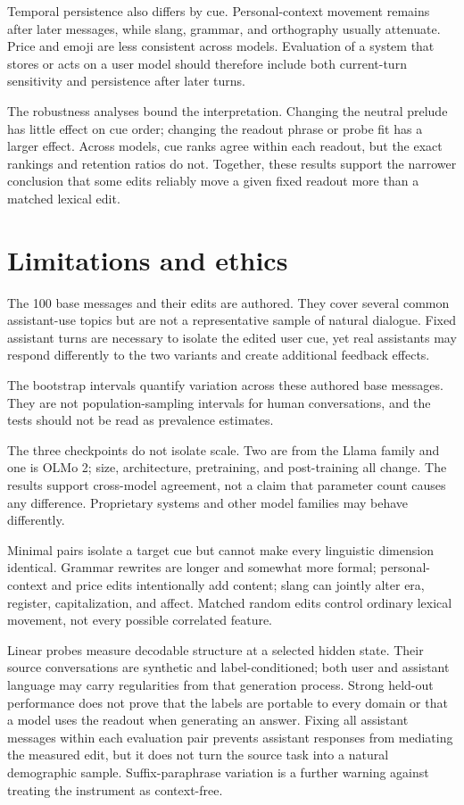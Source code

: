 \documentclass[11pt]{article}
\begin{document}
Temporal persistence also differs by cue. Personal-context movement remains
after later messages, while slang, grammar, and orthography usually attenuate.
Price and emoji are less consistent across models. Evaluation of a system that
stores or acts on a user model should therefore include both current-turn
sensitivity and persistence after later turns.

The robustness analyses bound the interpretation. Changing the neutral prelude
has little effect on cue order; changing the readout phrase or probe fit has a
larger effect. Across models, cue ranks agree within each readout, but the exact
rankings and retention ratios do not. Together, these results support the
narrower conclusion that some edits reliably move a given fixed readout more
than a matched lexical edit.

\section{Limitations and ethics}

The 100 base messages and their edits are authored. They cover several common
assistant-use topics but are not a representative sample of natural dialogue.
Fixed assistant turns are necessary to isolate the edited user cue, yet real
assistants may respond differently to the two variants and create additional
feedback effects.

The bootstrap intervals quantify variation across these authored base
messages. They are not population-sampling intervals for human conversations,
and the tests should not be read as prevalence estimates.

The three checkpoints do not isolate scale. Two are from the Llama family and
one is OLMo 2; size, architecture, pretraining, and post-training all change.
The results support cross-model agreement, not a claim that parameter count
causes any difference. Proprietary systems and other model families may
behave differently.

Minimal pairs isolate a target cue but cannot make every linguistic dimension
identical. Grammar rewrites are longer and somewhat more formal;
personal-context and price edits intentionally add content; slang can jointly alter era,
register, capitalization, and affect. Matched random edits control ordinary
lexical movement, not every possible correlated feature.

Linear probes measure decodable structure at a selected hidden state. Their
source conversations are synthetic and label-conditioned; both user and
assistant language may carry regularities from that generation process. Strong
held-out performance does not prove that the labels are portable to every
domain or that a model uses the readout when generating an answer. Fixing all
assistant messages within each evaluation pair prevents assistant responses
from mediating the measured edit, but it does not turn the source task into a
natural demographic sample. Suffix-paraphrase variation is a further warning
against treating the instrument as context-free.
\end{document}
